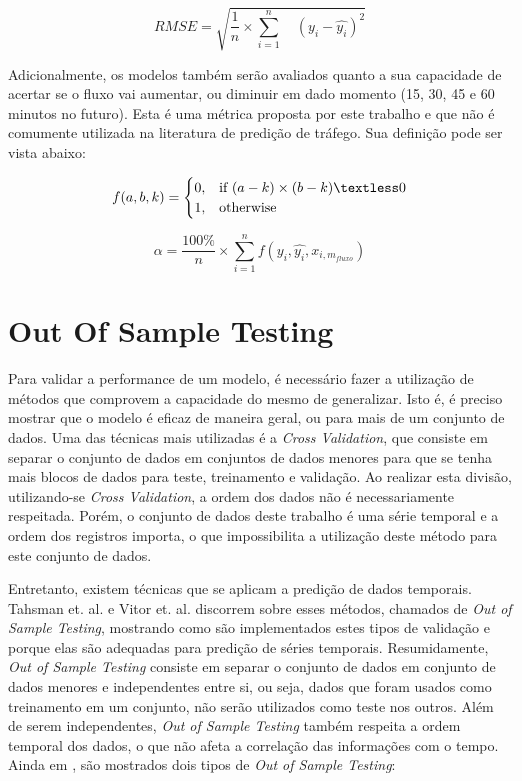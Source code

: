 \begin{equation}
\label{eq:rmse}
RMSE = \sqrt{ \frac{1}{n} \times \sum_{i=1}^{n} \quad (y_i - \hat{y_i}) ^ 2}
\end{equation}

Adicionalmente, os modelos também serão avaliados quanto a sua capacidade de acertar se o fluxo vai aumentar, ou diminuir em dado momento (15, 30, 45 e 60 minutos no futuro). Esta é uma métrica proposta por este trabalho e que não é comumente utilizada na literatura de predição de tráfego. Sua definição pode ser vista abaixo:

\begin{equation}
f(a, b, k) =
\begin{cases}
  0, & \text{if}\ (a - k) \times (b - k) \textless 0 \\
  1, & \text{otherwise}
\end{cases}
\end{equation}

\begin{equation}
\alpha = \frac{100\%}{n} \times \sum_{i=1}^{n} f(y_i, \hat{y_i}, x_{i, m_{fluxo}})
\end{equation}

\section{Out Of Sample Testing}

Para validar a performance de um modelo, é necessário fazer a utilização de métodos que comprovem a capacidade do mesmo de generalizar. Isto é, é preciso mostrar que o modelo é eficaz de maneira geral, ou para mais de um conjunto de dados. Uma das técnicas mais utilizadas é a \textit{Cross Validation}, que consiste em separar o conjunto de dados em conjuntos de dados menores para que se tenha mais blocos de dados para teste, treinamento e validação. Ao realizar esta divisão, utilizando-se \textit{Cross Validation}, a ordem dos dados não é necessariamente respeitada. Porém, o conjunto de dados deste trabalho é uma série temporal e a ordem dos registros importa, o que impossibilita a utilização deste método para este conjunto de dados. 

Entretanto, existem técnicas que se aplicam a predição de dados temporais. Tahsman et. al. \cite{Tashman_2000} e Vitor et. al. \cite{Vitor_2019} discorrem sobre esses métodos, chamados de \textit{Out of Sample Testing}, mostrando como são implementados estes tipos de validação e porque elas são adequadas para predição de séries temporais. Resumidamente, \textit{Out of Sample Testing} consiste em separar o conjunto de dados em conjunto de dados menores e independentes entre si, ou seja, dados que foram usados como treinamento em um conjunto, não serão utilizados como teste nos outros. Além de serem independentes, \textit{Out of Sample Testing} também respeita a ordem temporal dos dados, o que não afeta a correlação das informações com o tempo. Ainda em \cite{Tashman_2000}, são mostrados dois tipos de \textit{Out of Sample Testing}:

